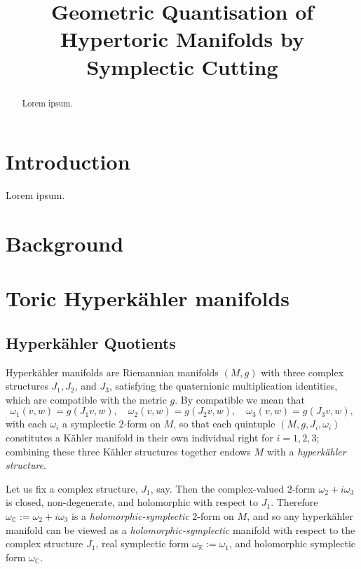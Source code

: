 \documentclass{article}
\title{Geometric Quantisation of Hypertoric Manifolds by Symplectic Cutting}
\date{}	%
\newcommand{\w}{\omega}
\newcommand{\RR}{\mathbb{R}}
\newcommand{\CC}{\mathbb{C}}
\begin{document}
	\maketitle
	
	\begin{abstract}
		Lorem ipsum.
	\end{abstract}
	
	\section{Introduction}
	
	Lorem ipsum.
	
	\section{Background}
	
	\section{Toric Hyperk\"ahler manifolds}
	
	\subsection{Hyperk\"ahler Quotients}
	
	Hyperk\"ahler manifolds are Riemannian manifolds $(M,g)$ with three complex structures $J_{1}, J_{2}$, and $J_{3}$, satisfying the quaternionic multiplication identities, which are compatible with the metric $g$. By compatible we mean that
	\[
		\w_{1}(v,w) = g(J_{1}v,w),\quad \w_{2}(v,w) = g(J_{2}v,w),\quad \w_{3}(v,w) = g(J_{3}v,w),
	\]
	with each $\w_{i}$ a symplectic $2$-form on $M$, so that each quintuple $(M, g, J_{i}, \w_{i})$ constitutes a K\"ahler manifold in their own individual right for $i = 1, 2, 3$; combining these three K\"ahler structures together endows $M$ with a \emph{hyperk\"ahler structure}.
		
	Let us fix a complex structure, $J_{1}$, say. Then the complex-valued $2$-form $\w_{2} + i\w_{3}$ is closed, non-degenerate, and holomorphic with respect to $J_{1}$. Therefore $\w_{\CC} := \w_{2} + i\w_{3}$ is a \emph{holomorphic-symplectic} $2$-form on $M$, and so any hyperk\"ahler manifold can be viewed as a \emph{holomorphic-symplectic} manifold with respect to the complex structure $J_{1}$, real symplectic form $\w_{\RR} := \w_{1}$, and holomorphic symplectic form $\w_{\CC}$.
	
\end{document}
